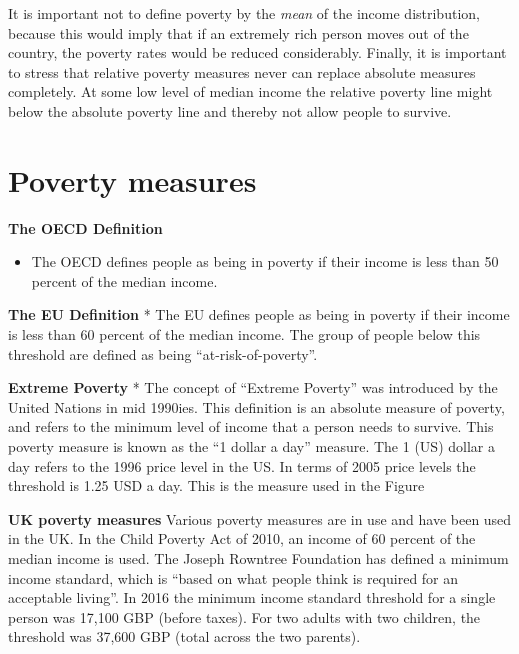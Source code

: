 \documentclass[]{book}
\providecommand{\tightlist}{%
  \setlength{\itemsep}{0pt}\setlength{\parskip}{0pt}}
\begin{document}
It is important not to define poverty by the \emph{mean} of the income distribution, because this would imply that if an extremely rich person moves out of the country, the poverty rates would be reduced considerably. Finally, it is important to stress that relative poverty measures never can replace absolute measures completely. At some low level of median income the relative poverty line might below the absolute poverty line and thereby not allow people to survive.

\hypertarget{poverty-measures}{%
\section{Poverty measures}\label{poverty-measures}}

\textbf{The OECD Definition}

\begin{itemize}
\tightlist
\item
  The OECD defines people as being in poverty if their income is less than 50 percent of the median income.
\end{itemize}

\textbf{The EU Definition}
* The EU defines people as being in poverty if their income is less than 60 percent of the median income. The group of people below this threshold are defined as being ``at-risk-of-poverty''.

\textbf{Extreme Poverty}
* The concept of ``Extreme Poverty'' was introduced by the United Nations in mid 1990ies. This definition is an absolute measure of poverty, and refers to the minimum level of income that a person needs to survive. This poverty measure is known as the ``1 dollar a day'' measure. The 1 (US) dollar a day refers to the 1996 price level in the US. In terms of 2005 price levels the threshold is 1.25 USD a day. This is the measure used in the Figure

\textbf{UK poverty measures}
Various poverty measures are in use and have been used in the UK. In the Child Poverty Act of 2010, an income of 60 percent of the median income is used. The Joseph Rowntree Foundation has defined a minimum income standard, which is ``based on what people think is required for an acceptable living''. In 2016 the minimum income standard threshold for a single person was 17,100 GBP (before taxes). For two adults with two children, the threshold was 37,600 GBP (total across the two parents).
\end{document}

